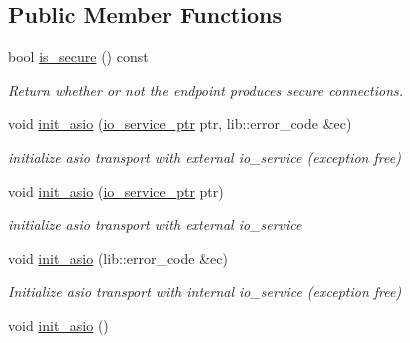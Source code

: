 \subsection*{Public Member Functions}
\begin{DoxyCompactItemize}
\item 
\mbox{\label{classwebsocketpp_1_1transport_1_1asio_1_1endpoint_a31d10fbfbc4bc7693c5f1679bc35516f}} 
bool \mbox{\hyperlink{classwebsocketpp_1_1transport_1_1asio_1_1endpoint_a31d10fbfbc4bc7693c5f1679bc35516f}{is\+\_\+secure}} () const
\begin{DoxyCompactList}\small\item\em Return whether or not the endpoint produces secure connections. \end{DoxyCompactList}\item 
void \mbox{\hyperlink{classwebsocketpp_1_1transport_1_1asio_1_1endpoint_a67da637106d3cfb40078b477e2579a13}{init\+\_\+asio}} (\mbox{\hyperlink{classwebsocketpp_1_1transport_1_1asio_1_1endpoint_acc7e89c6427514628f551cf3f795b7e0}{io\+\_\+service\+\_\+ptr}} ptr, lib\+::error\+\_\+code \&ec)
\begin{DoxyCompactList}\small\item\em initialize asio transport with external io\+\_\+service (exception free) \end{DoxyCompactList}\item 
void \mbox{\hyperlink{classwebsocketpp_1_1transport_1_1asio_1_1endpoint_a320fc4ea3a151afaf8b973ce32effd25}{init\+\_\+asio}} (\mbox{\hyperlink{classwebsocketpp_1_1transport_1_1asio_1_1endpoint_acc7e89c6427514628f551cf3f795b7e0}{io\+\_\+service\+\_\+ptr}} ptr)
\begin{DoxyCompactList}\small\item\em initialize asio transport with external io\+\_\+service \end{DoxyCompactList}\item 
void \mbox{\hyperlink{classwebsocketpp_1_1transport_1_1asio_1_1endpoint_a7b4249fd3e2663323ac29ef7935278de}{init\+\_\+asio}} (lib\+::error\+\_\+code \&ec)
\begin{DoxyCompactList}\small\item\em Initialize asio transport with internal io\+\_\+service (exception free) \end{DoxyCompactList}\item 
void \mbox{\hyperlink{classwebsocketpp_1_1transport_1_1asio_1_1endpoint_a22938eec899a9ab2b9ada2b76172f798}{init\+\_\+asio}} ()

\end{DoxyCompactItemize}
